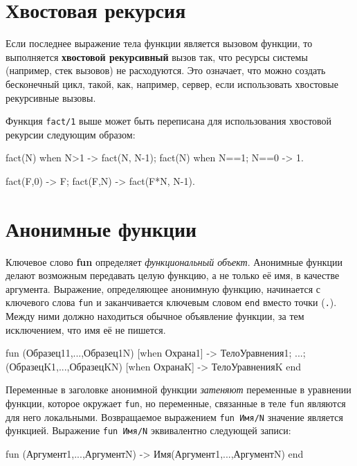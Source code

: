 \section{Хвостовая рекурсия}

Если последнее выражение тела функции является вызовом функции, то выполняется
\textbf{хвостовой рекурсивный} вызов так, что ресурсы системы (например, стек
вызовов) не расходуются. Это означает, что можно создать бесконечный цикл, 
такой, как, например, сервер, если использовать хвостовые рекурсивные вызовы.

Функция \texttt{fact/1} выше может быть переписана для использования хвостовой
рекурсии следующим образом:

 \begin{erlang}
fact(N) when N>1 -> fact(N, N-1);
fact(N) when N==1; N==0 -> 1.

fact(F,0) -> F;       %
fact(F,N) -> fact(F*N, N-1).
\end{erlang}



\section{Анонимные функции}
\label{functions:funs}

Ключевое слово \textbf{fun} определяет \emph{функциональный объект}. Анонимные 
функции делают возможным передавать целую функцию, а не только её имя, в 
качестве аргумента. Выражение, определяющее анонимную функцию, начинается с
ключевого слова \texttt{fun} и заканчивается ключевым словом \texttt{end}
вместо точки (\texttt{.}).  Между ними должно находиться обычное объявление
функции, за тем исключением, что имя её не пишется.

\begin{erlangru}
fun
    (Образец11,...,Образец1N) [when Охрана1] ->
        ТелоУравнения1;
        ...;
    (ОбразецK1,...,ОбразецKN) [when ОхранаK] ->
        ТелоУравненияK
end
\end{erlangru}

Переменные в заголовке анонимной функции \emph{затеняют} переменные в уравнении
функции, которое окружает \texttt{fun}, но переменные, связанные в теле 
\texttt{fun} являются для него локальными.  Возвращаемое выражением \texttt{fun 
Имя/N} значение является функцией. Выражение \texttt{fun Имя/N} эквивалентно 
следующей записи:

\begin{erlangru}
fun (Аргумент1,...,АргументN) -> Имя(Аргумент1,...,АргументN) end
\end{erlangru}

